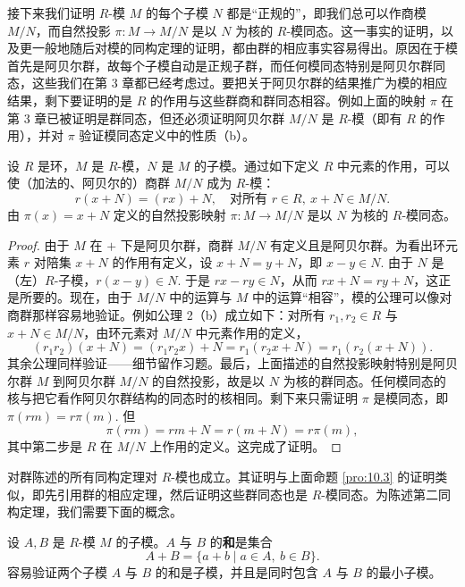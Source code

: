 接下来我们证明 \(R\)-模 \(M\) 的每个子模 \(N\) 都是“正规的”，即我们总可以作商模 \(M/N\)，而自然投影 \(\pi : M \to M/N\) 是以 \(N\) 为核的 \(R\)-模同态。这一事实的证明，以及更一般地随后对模的同构定理的证明，都由群的相应事实容易得出。原因在于模首先是阿贝尔群，故每个子模自动是正规子群，而任何模同态特别是阿贝尔群同态，这些我们在第 3 章都已经考虑过。要把关于阿贝尔群的结果推广为模的相应结果，剩下要证明的是 \(R\) 的作用与这些群商和群同态相容。例如上面的映射 \(\pi\) 在第 3 章已被证明是群同态，但还必须证明阿贝尔群 \(M/N\) 是 \(R\)-模（即有 \(R\) 的作用），并对 \(\pi\) 验证模同态定义中的性质（b）。

\begin{proposition}\label{pro:10.3}
设 \(R\) 是环，\(M\) 是 \(R\)-模，\(N\) 是 \(M\) 的子模。通过如下定义 \(R\) 中元素的作用，可以使（加法的、阿贝尔的）商群 \(M/N\) 成为 \(R\)-模：
\[
r(x+N) = (rx)+N, \quad \text{对所有 } r \in R,\ x+N \in M/N.
\]
由 \(\pi(x) = x+N\) 定义的自然投影映射 \(\pi : M \to M/N\) 是以 \(N\) 为核的 \(R\)-模同态。
\end{proposition}

\begin{proof}
由于 \(M\) 在 \(+\) 下是阿贝尔群，商群 \(M/N\) 有定义且是阿贝尔群。为看出环元素 \(r\) 对陪集 \(x+N\) 的作用有定义，设 \(x+N = y+N\)，即 \(x-y \in N\). 由于 \(N\) 是（左）\(R\)-子模，\(r(x-y) \in N\). 于是 \(rx-ry \in N\)，从而 \(rx+N = ry+N\)，这正是所要的。现在，由于 \(M/N\) 中的运算与 \(M\) 中的运算“相容”，模的公理可以像对商群那样容易地验证。例如公理 2（b）成立如下：对所有 \(r_1, r_2 \in R\) 与 \(x+N \in M/N\)，由环元素对 \(M/N\) 中元素作用的定义，
\[
(r_1r_2)(x+N) = (r_1r_2x)+N = r_1(r_2x+N) = r_1(r_2(x+N)).
\]
其余公理同样验证——细节留作习题。最后，上面描述的自然投影映射特别是阿贝尔群 \(M\) 到阿贝尔群 \(M/N\) 的自然投影，故是以 \(N\) 为核的群同态。任何模同态的核与把它看作阿贝尔群结构的同态时的核相同。剩下来只需证明 \(\pi\) 是模同态，即 \(\pi(rm) = r\pi(m)\). 但
\[
\pi(rm) = rm+N = r(m+N) = r\pi(m),
\]
其中第二步是 \(R\) 在 \(M/N\) 上作用的定义。这完成了证明。
\end{proof}

对群陈述的所有同构定理对 \(R\)-模也成立。其证明与上面命题 \ref{pro:10.3} 的证明类似，即先引用群的相应定理，然后证明这些群同态也是 \(R\)-模同态。为陈述第二同构定理，我们需要下面的概念。

\begin{definition}
设 \(A, B\) 是 \(R\)-模 \(M\) 的子模。\(A\) 与 \(B\) 的\textbf{和}是集合
\[
A+B = \{a+b \mid a \in A,\ b \in B\}.
\]
容易验证两个子模 \(A\) 与 \(B\) 的和是子模，并且是同时包含 \(A\) 与 \(B\) 的最小子模。
\end{definition}

